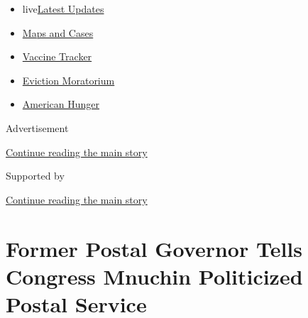 \begin{itemize}
\tightlist
\item
  live\href{https://www.nytimes3xbfgragh.onion/2020/09/08/world/covid-19-coronavirus.html?name=styln-coronavirus-national\&region=TOP_BANNER\&block=storyline_menu_recirc\&action=click\&pgtype=Article\&impression_id=e0acb140-f279-11ea-afab-150d323ee948\&variant=undefined}{Latest
  Updates}
\item
  \href{https://www.nytimes3xbfgragh.onion/interactive/2020/us/coronavirus-us-cases.html?name=styln-coronavirus-national\&region=TOP_BANNER\&block=storyline_menu_recirc\&action=click\&pgtype=Article\&impression_id=e0acb141-f279-11ea-afab-150d323ee948\&variant=undefined}{Maps
  and Cases}
\item
  \href{https://www.nytimes3xbfgragh.onion/interactive/2020/science/coronavirus-vaccine-tracker.html?name=styln-coronavirus-national\&region=TOP_BANNER\&block=storyline_menu_recirc\&action=click\&pgtype=Article\&impression_id=e0acb142-f279-11ea-afab-150d323ee948\&variant=undefined}{Vaccine
  Tracker}
\item
  \href{https://www.nytimes3xbfgragh.onion/2020/09/02/your-money/eviction-moratorium-covid.html?name=styln-coronavirus-national\&region=TOP_BANNER\&block=storyline_menu_recirc\&action=click\&pgtype=Article\&impression_id=e0acb143-f279-11ea-afab-150d323ee948\&variant=undefined}{Eviction
  Moratorium}
\item
  \href{https://www.nytimes3xbfgragh.onion/interactive/2020/09/02/magazine/food-insecurity-hunger-us.html?name=styln-coronavirus-national\&region=TOP_BANNER\&block=storyline_menu_recirc\&action=click\&pgtype=Article\&impression_id=e0acb144-f279-11ea-afab-150d323ee948\&variant=undefined}{American
  Hunger}
\end{itemize}

Advertisement

\protect\hyperlink{after-top}{Continue reading the main story}

Supported by

\protect\hyperlink{after-sponsor}{Continue reading the main story}

\hypertarget{former-postal-governor-tells-congress-mnuchin-politicized-postal-service}{%
\section{Former Postal Governor Tells Congress Mnuchin Politicized
Postal
Service}\label{former-postal-governor-tells-congress-mnuchin-politicized-postal-service}}


